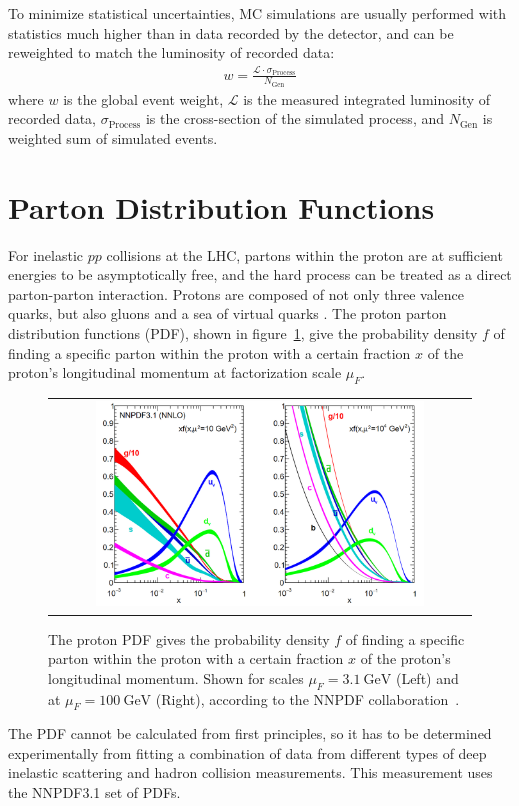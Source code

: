 To minimize statistical uncertainties, MC simulations are usually performed with statistics much higher than in data recorded by the detector, and can be reweighted to match the luminosity of recorded data:
\begin{align}
w = \frac{\mathcal{L} \cdot \sigma_{\text{Process}}}{N_{\text{Gen}}}
\end{align}
where $w$ is the global event weight, $\mathcal{L}$ is the measured integrated luminosity of recorded data, $\sigma_{\text{Process}}$ is the cross-section of the simulated process, and $N_{\text{Gen}}$ is weighted sum of simulated events.

\section{Parton Distribution Functions}
For inelastic $pp$ collisions at the LHC, partons within the proton are at sufficient energies to be asymptotically free, and the hard process can be treated as a direct parton-parton interaction.
Protons are composed of not only three valence quarks, but also gluons and a sea of virtual quarks .
The proton parton distribution functions (PDF), shown in figure~\ref{Parton_Distribution_Functions}, give the probability density $f$ of finding a specific parton within the proton with a certain fraction $x$ of the proton's longitudinal momentum at factorization scale $\mu_F$.
\begin{figure}[!h]
  \begin{center}
    \begin{tabular}{c}
        \includegraphics[width=0.80\textwidth]{fig_Event_Simulation/Parton_Distribution_Functions.png}
    \end{tabular}
    \caption{The proton PDF gives the probability density $f$ of finding a specific parton within the proton with a certain fraction $x$ of the proton's longitudinal momentum.
    Shown for scales $\mu_F = \SI{3.1}{\GeV}$ (Left) and at $\mu_F = \SI{100}{\GeV}$ (Right), according to the NNPDF collaboration~\cite{Ball:2267455}.
            }
    \label{Parton_Distribution_Functions}
  \end{center}
\end{figure}
The PDF cannot be calculated from first principles, so it has to be determined experimentally from fitting a combination of data from different types of deep inelastic scattering and hadron collision measurements.
This measurement uses the NNPDF3.1 set of PDFs.

